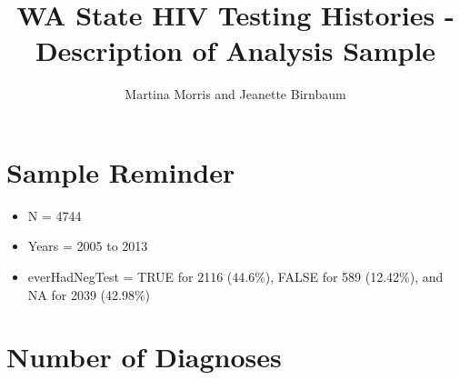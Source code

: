 \documentclass{article}\usepackage[]{graphicx}\usepackage[]{color}
\begin{document}
\title{WA State HIV Testing Histories - Description of Analysis Sample}
\author{Martina Morris and Jeanette Birnbaum}
\maketitle

\section{Sample Reminder}

\begin{itemize}
    \item N = 4744
    \item Years = 2005 to 2013
    \item everHadNegTest = TRUE for 2116 (44.6\%), FALSE for 589 (12.42\%), and NA for 2039 (42.98\%)
\end{itemize}

\section{Number of Diagnoses}
\end{document}

